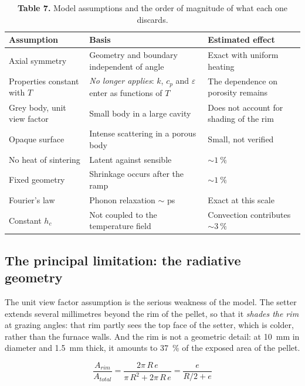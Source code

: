 \documentclass[11pt,a4paper]{article}
\begin{document}
\begin{table}[htbp]
\centering
\caption*{\textcolor{uji}{\textbf{Table 7.}} Model assumptions and the
order of magnitude of what each one discards.}
\begin{tabular}{p{4.4cm}p{5.6cm}p{3.6cm}}
\toprule
Assumption & Basis & Estimated effect \\
\midrule
Axial symmetry & Geometry and boundary independent of angle & Exact with uniform heating \\
Properties constant with $T$ & \emph{No longer applies}: $k$, $c_p$ and $\varepsilon$ enter as functions of $T$ & The dependence on porosity remains \\
Grey body, unit view factor & Small body in a large cavity & Does not account for shading of the rim \\
Opaque surface & Intense scattering in a porous body & Small, not verified \\
No heat of sintering & Latent against sensible & $\sim\SI{1}{\percent}$ \\
Fixed geometry & Shrinkage occurs after the ramp & $\sim\SI{1}{\percent}$ \\
Fourier's law & Phonon relaxation $\sim$ ps & Exact at this scale \\
Constant $h_c$ & Not coupled to the temperature field & Convection contributes $\sim\SI{3}{\percent}$ \\
\bottomrule
\end{tabular}
\end{table}

\subsection{The principal limitation: the radiative geometry}

The unit view factor assumption is the serious weakness of the model. The
setter extends several millimetres beyond the rim of the pellet, so that it
\emph{shades the rim} at grazing angles: that rim partly sees the top face
of the setter, which is colder, rather than the furnace walls. And the rim
is not a geometric detail: at \SI{10}{\milli\meter} in diameter and
\SI{1.5}{\milli\meter} thick, it amounts to \SI{37}{\percent} of the
exposed area of the pellet.

\begin{equation}
\frac{A_{rim}}{A_{total}}
= \frac{2\pi\, R\, e}{\pi\, R^{2} + 2\pi\, R\, e}
= \frac{e}{R/2 + e}
\end{equation}
\end{document}
